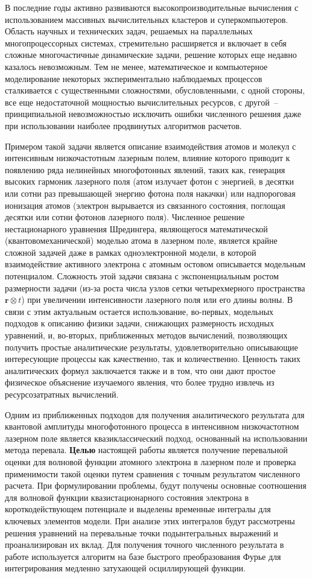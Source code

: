 \documentclass[%
bachelor,    %
natbib,      %
subf,        %
href,        %
colorlinks,  %
]{disser}
\newcommand{\vr}{\mathbf{r}}
\begin{document}
В последние годы активно развиваются высокопроизводительные вычисления с использованием массивных вычислительных кластеров и суперкомпьютеров. Область научных и технических задач, решаемых на параллельных многопроцессорных системах, стремительно расширяется и включает в себя сложные многочастичные динамические задачи, решение которых еще недавно казалось невозможным. Тем не менее, математическое и компьютерное моделирование некоторых экспериментально наблюдаемых процессов сталкивается с существенными сложностями, обусловленными, с одной стороны, все еще недостаточной мощностью вычислительных ресурсов, с другой~-- принципиальной невозможностью исключить ошибки численного решения даже при использовании наиболее продвинутых алгоритмов расчетов.  

Примером такой задачи является описание взаимодействия атомов и молекул с интенсивным низкочастотным лазерным полем, влияние которого приводит к появлению ряда нелинейных многофотонных явлений, таких как, генерация высоких гармоник лазерного поля (атом излучает фотон с энергией, в десятки или сотни раз превышающей энергию фотона поля накачки) или надпороговая ионизация атомов (электрон вырывается из связанного состояния, поглощая десятки или сотни фотонов лазерного поля). Численное решение нестационарного уравнения Шредингера, являющегося математической (квантовомеханической) моделью атома в лазерном поле, является крайне сложной задачей даже в рамках одноэлектронной модели, в которой взаимодействие активного электрона с атомным остовом описывается модельным потенциалом. Сложность этой задачи связана с экспоненциальным ростом размерности задачи (из-за роста числа узлов сетки четырехмерного пространства $\vr\otimes t$) при увеличении интенсивности лазерного поля или его длины волны. В связи с этим актуальным остается использование, во-первых, модельных подходов к описанию физики задачи, снижающих размерность исходных уравнений, и, во-вторых, приближенных методов вычислений, позволяющих получить простые аналитические результаты, удовлетворительно описывающие интересующие процессы как качественно, так и количественно. Ценность таких аналитических формул заключается также и в том, что они дают простое физическое объяснение изучаемого явления, что более трудно извлечь из ресурсозатратных вычислений.

Одним из приближенных подходов для получения аналитического результата для квантовой амплитуды многофотонного процесса в интенсивном низкочастотном лазерном поле является квазиклассический подход, основанный на использовании метода перевала. \textbf{Целью} настоящей работы является получение перевальной оценки для волновой функции атомного электрона в лазерном поле и проверка применимости такой оценки путем сравнения с точным результатом численного расчета. При формулировании проблемы, будут получены основные соотношения для волновой функции квазистационарного состояния электрона в короткодействующем потенциале и выделены временные интегралы для ключевых элементов модели. При анализе этих интегралов будут рассмотрены решения уравнений на перевальные точки подынтегральных выражений и проанализирован их вклад. Для получения точного численного результата в работе используется алгоритм на базе быстрого преобразования Фурье для интегрирования медленно затухающей осциллирующей функции.
\end{document}
